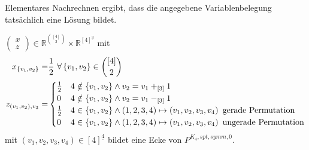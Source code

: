 \documentclass[10p,a4paper,BCOR = 12mm, DIV=15]{scrbook}
\begin{document}
\begin{bew}
Elementares Nachrechnen ergibt, dass die angegebene Variablenbelegung tatsächlich eine Lösung bildet.
\end{bew}

\begin{Le}
\label{le:ecke_P_p^4,symm,0_2}
$\left(
\begin{array}{c}
x \\
z
\end{array}
\right)\in \mathbb{R}^{[4]\choose 2}\times \mathbb{R}^{[4]^{\underline{3}}}$ mit
\begin{align*}
x_{\left\{v_1, v_2\right\}} = & \frac{1}{2}\ \forall \left\{v_1, v_2\right\}\in {[4]\choose 2} \\
z_{\left(v_1, v_2\right), v_3} = & \begin{cases}
\frac{1}{2} & 4 \notin \left\{v_1, v_2\right\} \wedge v_2 = v_1 +_{\left[3\right]} 1 \\
0 & 4 \notin \left\{v_1, v_2\right\} \wedge v_2 = v_1 -_{\left[3\right]} 1 \\
\frac{1}{2} & 4 \in \left\{v_1, v_2\right\} \wedge \left(1, 2, 3, 4\right) \mapsto \left(v_1, v_2, v_3, v_4\right)\textnormal{ gerade Permutation} \\
0 & 4 \in \left\{v_1, v_2\right\} \wedge \left(1, 2, 3, 4\right) \mapsto \left(v_1, v_2, v_3, v_4\right)\textnormal{ ungerade Permutation}
\end{cases}
\end{align*}
mit $\left(v_1, v_2, v_3, v_4\right) \in \left[4\right]^{\underline{4}}$ bildet eine Ecke von $P^{K_4, spt, symm, 0}$.
\end{Le}
\end{document}
